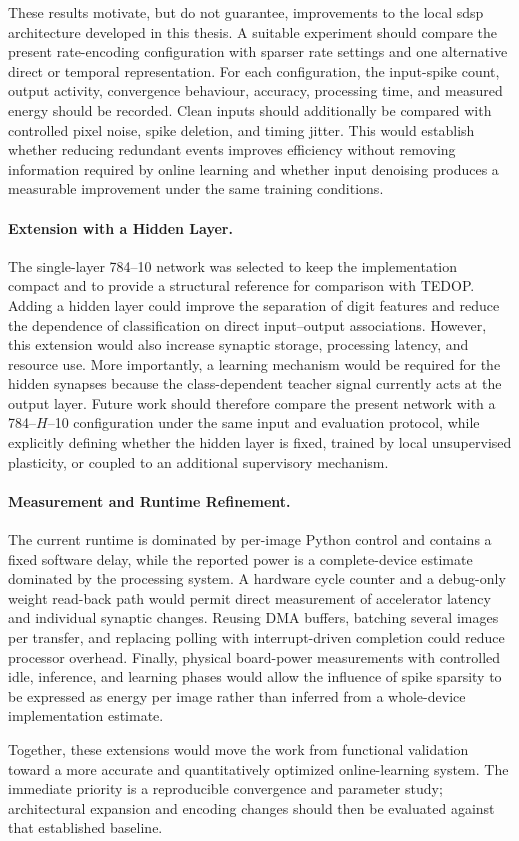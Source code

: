 These results motivate, but do not guarantee, improvements to the local \gls{sdsp} architecture developed in this thesis. A suitable experiment should compare the present rate-encoding configuration with sparser rate settings and one alternative direct or temporal representation. For each configuration, the input-spike count, output activity, convergence behaviour, accuracy, processing time, and measured energy should be recorded. Clean inputs should additionally be compared with controlled pixel noise, spike deletion, and timing jitter. This would establish whether reducing redundant events improves efficiency without removing information required by online learning and whether input denoising produces a measurable improvement under the same training conditions.

\paragraph{Extension with a Hidden Layer.}
The single-layer 784--10 network was selected to keep the implementation compact and to provide a structural reference for comparison with TEDOP. Adding a hidden layer could improve the separation of digit features and reduce the dependence of classification on direct input--output associations. However, this extension would also increase synaptic storage, processing latency, and resource use. More importantly, a learning mechanism would be required for the hidden synapses because the class-dependent teacher signal currently acts at the output layer. Future work should therefore compare the present network with a 784--$H$--10 configuration under the same input and evaluation protocol, while explicitly defining whether the hidden layer is fixed, trained by local unsupervised plasticity, or coupled to an additional supervisory mechanism.

\paragraph{Measurement and Runtime Refinement.}
The current runtime is dominated by per-image Python control and contains a fixed software delay, while the reported power is a complete-device estimate dominated by the processing system. A hardware cycle counter and a debug-only weight read-back path would permit direct measurement of accelerator latency and individual synaptic changes. Reusing DMA buffers, batching several images per transfer, and replacing polling with interrupt-driven completion could reduce processor overhead. Finally, physical board-power measurements with controlled idle, inference, and learning phases would allow the influence of spike sparsity to be expressed as energy per image rather than inferred from a whole-device implementation estimate.

Together, these extensions would move the work from functional validation toward a more accurate and quantitatively optimized online-learning system. The immediate priority is a reproducible convergence and parameter study; architectural expansion and encoding changes should then be evaluated against that established baseline.
